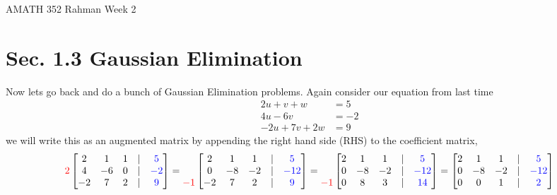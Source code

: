 \documentclass[reqno]{amsart}
\theoremstyle{definition}
\begin{document}
\begin{flushleft}
{\sc \Large AMATH 352 Rahman} \hfill Week 2
\bigskip
\end{flushleft}

\newcommand{\R}{\mathbb{R}}
\newcommand{\N}{\mathbb{N}}
\newcommand{\Z}{\mathbb{Z}}
\newcommand{\Q}{\mathbb{Q}}
\renewcommand{\CancelColor}{\color{red}}
\newcommand{\?}{\stackrel{?}{=}}
\renewcommand{\varphi}{\phi}
\newcommand{\card}{\text{Card}}
\newcommand{\bigzero}{\text{\Huge 0}}



\section*{Sec. 1.3 Gaussian Elimination}

Now lets go back and do a bunch of Gaussian Elimination problems.  Again consider our equation from last time
%
\begin{equation}
\begin{split}
2u + v + w &= 5\\
4u - 6v &= -2\\
-2u + 7v + 2w &= 9
\end{split}
\end{equation}
%
we will write this as an augmented matrix by appending the right hand side (RHS) to the coefficient matrix,
%
\begin{equation*}
\begin{matrix}
\\
{\color{red} 2}\\
\\
\end{matrix}\begin{bmatrix}
2 & 1 & 1 & | & {\color{blue}5}\\
4 & -6 & 0 & | & {\color{blue}-2}\\
-2 & 7 & 2 & | & {\color{blue}9}
\end{bmatrix} = \begin{matrix}
\\
\\
{\color{red}-1}
\end{matrix}\begin{bmatrix}
2 & 1 & 1 & | & {\color{blue}5}\\
0 & -8 & -2 & | & {\color{blue}-12}\\
-2 & 7 & 2 & | & {\color{blue}9}
\end{bmatrix} = \begin{matrix}
\\
\\
{\color{red}-1}
\end{matrix} \begin{bmatrix}
2 & 1 & 1 & | & {\color{blue}5}\\
0 & -8 & -2 & | & {\color{blue}-12}\\
0 & 8 & 3 & | & {\color{blue}14}
\end{bmatrix} = \begin{bmatrix}
2 & 1 & 1 & | & {\color{blue}5}\\
0 & -8 & -2 & | & {\color{blue}-12}\\
0 & 0 & 1 & | & {\color{blue}2}
\end{bmatrix}
\end{equation*}
\end{document}
